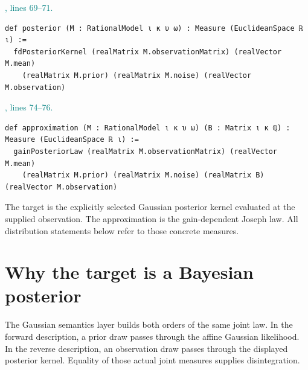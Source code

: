 \documentclass[11pt]{article}\usepackage{needspace}\renewcommand{\paperkind}{Lean companion}\setlength{\parskip}{0.35em}
\begin{document}


{\small\textcolor{teal}{, lines 69--71.}\par}

\begin{lstlisting}[style=BayesSource]
def posterior (M : RationalModel ι κ υ ω) : Measure (EuclideanSpace ℝ ι) :=
  fdPosteriorKernel (realMatrix M.observationMatrix) (realVector M.mean)
    (realMatrix M.prior) (realMatrix M.noise) (realVector M.observation)
\end{lstlisting}



{\small\textcolor{teal}{, lines 74--76.}\par}

\begin{lstlisting}[style=BayesSource]
def approximation (M : RationalModel ι κ υ ω) (B : Matrix ι κ ℚ) : Measure (EuclideanSpace ℝ ι) :=
  gainPosteriorLaw (realMatrix M.observationMatrix) (realVector M.mean)
    (realMatrix M.prior) (realMatrix M.noise) (realMatrix B) (realVector M.observation)
\end{lstlisting}

The target is the explicitly selected Gaussian posterior kernel evaluated at the supplied observation. The approximation is the gain-dependent Joseph law. All distribution statements below refer to those concrete measures.

\section{Why the target is a Bayesian posterior}

The Gaussian semantics layer builds both orders of the same joint law. In the forward description, a prior draw passes through the affine Gaussian likelihood. In the reverse description, an observation draw passes through the displayed posterior kernel. Equality of those actual joint measures supplies disintegration.
\end{document}
